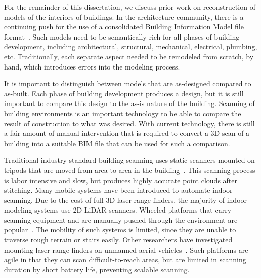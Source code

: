 \documentclass[12pt,onecolumn,oneside]{book}
\begin{document}
For the remainder of this dissertation, we discuss prior work on reconstruction of models of the interiors of buildings.  In the architecture community, there is a continuing push for the use of a consolidated Building Information Model file format~\cite{AutodeskBIM}.  Such models need to be semantically rich for all phases of building development, including architectural, structural, mechanical, electrical, plumbing, etc.  Traditionally, each separate aspect needed to be remodeled from scratch, by hand, which introduces errors into the modeling process.

It is important to distinguish between models that are as-designed compared to as-built.  Each phase of building development produces a design, but it is still important to compare this design to the as-is nature of the building.  Scanning of building environments is an important technology to be able to compare the result of construction to what was desired.  With current technology, there is still a fair amount of manual intervention that is required to convert a 3D scan of a building into a suitable BIM file that can be used for such a comparison.

Traditional industry-standard building scanning uses static scanners mounted on tripods that are moved from area to area in the building~\cite{RoomSegmentation,WallFinder,BasicPlaneFit}. This scanning process is labor intensive and slow, but produces highly accurate point clouds after stitching.  Many mobile systems have been introduced to automate indoor scanning. Due to the cost of full 3D laser range finders, the majority of indoor modeling systems use 2D LiDAR scanners.  Wheeled platforms that carry scanning equipment and are manually pushed through the environment are popular~\cite{Carving, ProbabilisticRobotics}.  The mobility of such systems is limited, since they are unable to traverse rough terrain or stairs easily.  Other researchers have investigated mounting laser range finders on unmanned aerial vehicles~\cite{Quadrotor,QuadrotorMIT,SpectralClustering}.  Such platforms are agile in that they can scan difficult-to-reach areas, but are limited in scanning duration by short battery life, preventing scalable scanning.
\end{document}
